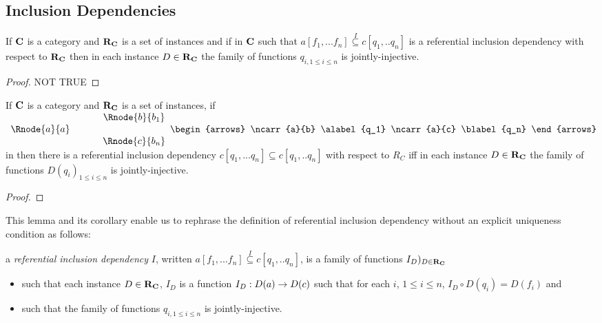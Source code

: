\documentclass[10pt,a4paper]{article}
\theoremstyle{remark}
\renewcommand{\term}[1]{\textit{#1}}  %
\begin{document}
\begin{newtt}
\subsection{Inclusion Dependencies}
\begin{oldtt}
\begin{lemma}
If $\textbf{C}$ is a category and $\textbf{R}_{\textbf{C}}$ is a set of instances and if
\fnsourceqnsource
in $\textbf{C}$
such that $a[f_1,...f_n] \overset{I}{\subseteq} c[q_1,..q_n]$ is a referential inclusion dependency with respect  to $\textbf{R}_{\textbf{C}}$ then in each instance $D \in \textbf{R}_{\textbf{C}}$ the family of functions
$q_{i, 1 \leq i \leq n}$ is jointly-injective.
\end{lemma}
\begin{proof}
NOT TRUE
\end{proof}
\end{oldtt}

\newcommand {\qnsourcediag}{
$
\begin{array}{c p{0.5cm} c  }
             &&   \Rnode{b}{b_1} \\[0.01cm]
\Rnode{a}{a} &&                \\[0.01cm] 
             &&   \Rnode{c}{b_n}         
\end{array} 
\begin{arrows}
\ncarr{a}{b}
\alabel{q_1}
\ncarr{a}{c}
\blabel{q_n}
\end{arrows}
$  
}


\begin{lemma}
If $\textbf{C}$ is a  category and $\textbf{R}_{\textbf{C}}$ is a set of instances, if \qnsourcediag in \catcw
then there is a referential inclusion dependency $c[q_1,...q_n] \subseteq c[q_1,..q_n]$
with respect to $R_C$
iff in each instance $D \in \textbf{R}_{\textbf{C}}$ the family of functions $D(q_{i})_{1 \leq i \leq n}$ is jointly-injective.
\end{lemma}
\begin{proof}
\end{proof}

This lemma and its corollary  enable us to rephrase the definition of referential inclusion dependency 
without an explicit uniqueness condition as follows:
\begin{definition}
a \term{referential inclusion dependency} $I$, written $a[f_1,...f_n] \overset{I}{\subseteq} c[q_1,..q_n]$, is a family of functions $I_D)_{D \in \textbf{R}_{\textbf{C}}}$
\begin{itemize}
\item such that each instance $D \in \textbf{R}_{\textbf{C}}$, $I_D$ is a  function $I_D : D(a) \rightarrow D(c)$ such that for each $i$, $1 \leq i \le n$, $I_D \circ D(q_i) = D(f_i)$ and 
\item such that the family of functions $q_{i, 1 \leq i \leq n}$ is jointly-injective.
\end{itemize}
\end{definition}
\end{newtt}




 

\end{document}
